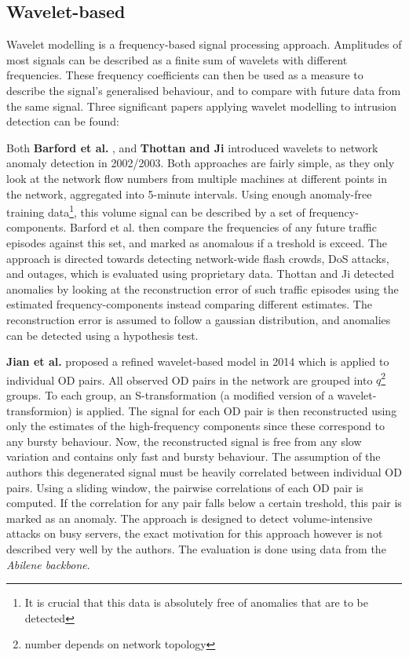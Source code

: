 \documentclass[a4paper,12pt,twoside]{report}
\begin{document}
\subsection{Wavelet-based}

Wavelet modelling is a frequency-based signal processing approach. Amplitudes of most signals can be described as a finite sum of wavelets with different frequencies. These frequency coefficients can then be used as a measure to describe the signal's generalised behaviour, and to compare with future data from the same signal. Three significant papers applying wavelet modelling to intrusion detection can be found:


Both \textbf{Barford et al.} \cite{barford2002signal}, and \textbf{Thottan and Ji} \cite{thottan2003anomaly} introduced wavelets to network anomaly detection in 2002/2003. Both approaches are fairly simple, as they only look at the network flow numbers from multiple machines at different points in the network, aggregated into 5-minute intervals. Using enough anomaly-free training data\footnote{It is crucial that this data is absolutely free of anomalies that are to be detected}, this volume signal can be described by a set of frequency-components. Barford et al. then compare the frequencies of any future traffic episodes against this set, and marked as anomalous if a treshold is exceed. The approach is directed towards detecting network-wide flash crowds, DoS attacks, and outages, which is evaluated using proprietary data. Thottan and Ji detected anomalies by looking at the reconstruction error of such traffic episodes using the estimated frequency-components instead comparing different estimates. The reconstruction error is assumed to follow a gaussian distribution, and anomalies can be detected using a hypothesis test.

\textbf{Jian et al.} \cite{jiang2014transform} proposed a refined wavelet-based model in 2014 which is applied to individual OD pairs. All observed OD pairs in the network are grouped into $q$\footnote{number depends on network topology} groups. To each group, an S-transformation (a modified version of a wavelet-transformion) is applied. The signal for each OD pair is then reconstructed using only the estimates of the high-frequency components since these correspond to any bursty behaviour. Now, the reconstructed signal is free from any slow variation and contains only fast and bursty behaviour. The assumption of the authors this degenerated signal must be heavily correlated between individual OD pairs. Using a sliding window, the pairwise correlations of each OD pair is computed. If the correlation for any pair falls below a certain treshold, this pair is marked as an anomaly. The approach is designed to detect volume-intensive attacks on busy servers, the exact motivation for this approach however is not described very well by the authors. The evaluation is done using data from the \textit{Abilene backbone}.
\end{document}

